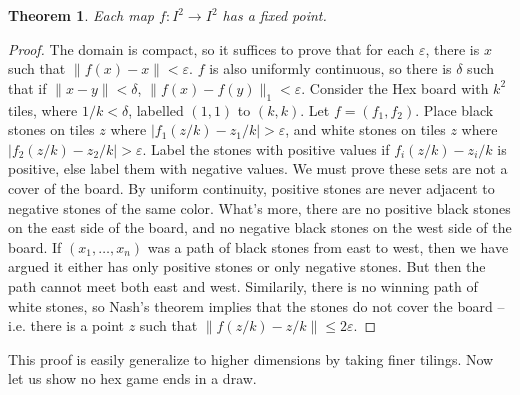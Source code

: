 \documentclass{article}
\theoremstyle{plain}
\newtheorem{theorem}{Theorem}
\begin{document}
\begin{theorem}
    Each map $f: I^2 \to I^2$ has a fixed point.
\end{theorem}
\begin{proof}
    The domain is compact, so it suffices to prove that for each $\varepsilon$, there is $x$ such that $\| f(x) - x \| < \varepsilon$. $f$ is also uniformly continuous, so there is $\delta$ such that if $\| x - y \| < \delta$, $\| f(x) - f(y) \|_1 < \varepsilon$. Consider the Hex board with $k^2$ tiles, where $1/k < \delta$, labelled $(1,1)$ to $(k,k)$. Let $f = (f_1, f_2)$. Place black stones on tiles $z$ where $| f_1(z/k) - z_1/k | > \varepsilon$, and white stones on tiles $z$ where $| f_2(z/k) - z_2/k | > \varepsilon$. Label the stones with positive values if $f_i(z/k) - z_i/k$ is positive, else label them with negative values. We must prove these sets are not a cover of the board. By uniform continuity, positive stones are never adjacent to negative stones of the same color. What's more, there are no positive black stones on the east side of the board, and no negative black stones on the west side of the board. If $(x_1, \dots, x_n)$ was a path of black stones from east to west, then we have argued it either has only positive stones or only negative stones. But then the path cannot meet both east and west. Similarily, there is no winning path of white stones, so Nash's theorem implies that the stones do not cover the board -- i.e. there is a point $z$ such that $\| f(z/k) - z/k \| \leq 2 \varepsilon$.
\end{proof}

This proof is easily generalize to higher dimensions by taking finer tilings. Now let us show no hex game ends in a draw.
\end{document}
